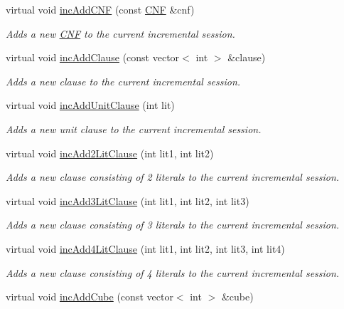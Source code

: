\begin{DoxyCompactItemize}
virtual void \hyperlink{classMiniSatApi_ae5ffe2811e01051c5206c9e4865a7102}{inc\-Add\-C\-N\-F} (const \hyperlink{classCNF}{C\-N\-F} \&cnf)
\begin{DoxyCompactList}\small\item\em Adds a new \hyperlink{classCNF}{C\-N\-F} to the current incremental session. \end{DoxyCompactList}\item 
virtual void \hyperlink{classMiniSatApi_af2115a84419b7480ff55b747f7ddd60a}{inc\-Add\-Clause} (const vector$<$ int $>$ \&clause)
\begin{DoxyCompactList}\small\item\em Adds a new clause to the current incremental session. \end{DoxyCompactList}\item 
virtual void \hyperlink{classMiniSatApi_ade09bb38667bb23f2ac993e2d6c66408}{inc\-Add\-Unit\-Clause} (int lit)
\begin{DoxyCompactList}\small\item\em Adds a new unit clause to the current incremental session. \end{DoxyCompactList}\item 
virtual void \hyperlink{classMiniSatApi_a56c4758ee7466cd7fa48a682fee76fd3}{inc\-Add2\-Lit\-Clause} (int lit1, int lit2)
\begin{DoxyCompactList}\small\item\em Adds a new clause consisting of 2 literals to the current incremental session. \end{DoxyCompactList}\item 
virtual void \hyperlink{classMiniSatApi_aee9556c8c5de695fa5d7aa7cfde57877}{inc\-Add3\-Lit\-Clause} (int lit1, int lit2, int lit3)
\begin{DoxyCompactList}\small\item\em Adds a new clause consisting of 3 literals to the current incremental session. \end{DoxyCompactList}\item 
virtual void \hyperlink{classMiniSatApi_ad78c29a67b210ac6f07ed3074b511bc1}{inc\-Add4\-Lit\-Clause} (int lit1, int lit2, int lit3, int lit4)
\begin{DoxyCompactList}\small\item\em Adds a new clause consisting of 4 literals to the current incremental session. \end{DoxyCompactList}\item 
virtual void \hyperlink{classMiniSatApi_a41e16a2e8757846fa17e010c5cc1ff16}{inc\-Add\-Cube} (const vector$<$ int $>$ \&cube)

\end{DoxyCompactItemize}
